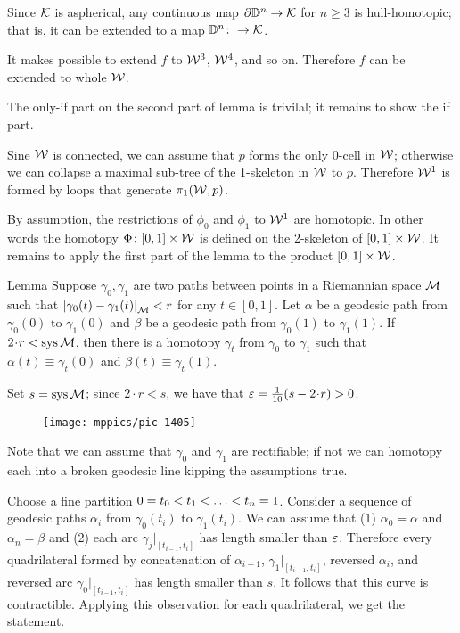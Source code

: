 Since $\mathcal{K}$ is aspherical, any continuous map $\partial\mathbb{D}^n\to \mathcal{K}$ for $n\ge 3$
is hull-homotopic;
that is, it can be extended to a map $\mathbb{D}^n\colon\to \mathcal{K}$.

It makes possible to extend $f$ to $\mathcal{W}^3$, $\mathcal{W}^4$, and so on.
Therefore $f$ can be extended to whole $\mathcal{W}$.

The only-if part on the second part of lemma is trivilal;
it remains to show the if part.

Sine $\mathcal{W}$ is connected, we can assume that $p$ forms the only 0-cell in $\mathcal{W}$;
otherwise we can collapse a maximal sub-tree of the 1-skeleton in $\mathcal{W}$ to $p$.
Therefore $\mathcal{W}^1$ is formed by loops that generate $\pi_1(\mathcal{W},p)$.

By assumption, the restrictions of $\phi_0$ and $\phi_1$ to $\mathcal{W}^1$ are homotopic.
In other words the homotopy $\Phi\colon[0,1]\times \mathcal{W}$ is defined on the 2-skeleton of $[0,1]\times \mathcal{W}$.
It remains to apply the first part of the lemma to the product $[0,1]\times \mathcal{W}$.
\qeds



\begin{thm}{Lemma}\label{lem:sys-homotopy}
Suppose $\gamma_0,\gamma_1$ are two paths between points in a Riemannian space $\mathcal{M}$ such that $\dist{\gamma_0(t)}{\gamma_1(t)}{\spc{M}}<r$ for any $t\in[0,1]$.
Let $\alpha$ be a geodesic path from $\gamma_0(0)$ to $\gamma_1(0)$ and $\beta$ be a geodesic path from $\gamma_0(1)$ to $\gamma_1(1)$. 
If $2\cdot r<\sys\spc{M}$, then there is a homotopy $\gamma_t$ from
$\gamma_0$ to $\gamma_1$ such that $\alpha(t)\equiv \gamma_t(0)$ and $\beta(t)\equiv \gamma_t(1)$.
\end{thm}

Set $s=\mathop{\rm sys}\nolimits\mathcal{M}$; 
since $2\cdot r<s$, we have that $\eps=\tfrac1{10}(s-2\cdot r)>0$.

\begin{wrapfigure}{o}{34mm}
\vskip-0mm
\centering
\texttt{[image: mppics/pic-1405]}
\end{wrapfigure}

Note that we can assume that $\gamma_0$ and $\gamma_1$ are rectifiable;
if not we can homotopy each into a broken geodesic line kipping the assumptions true. 

Choose a fine partition $0\z=t_0\z<t_1\z<\z\dots\z<t_n=1$.
Consider a sequence of geodesic paths $\alpha_i$ from $\gamma_0(t_i)$ to $\gamma_1(t_i)$.
We can assume that (1) $\alpha_0=\alpha$ and $\alpha_n=\beta$ and (2) each arc $\gamma_j|_{[t_{i-1},t_i]}$ has length smaller than $\varepsilon$.
Therefore every quadrilateral formed by concatenation  of $\alpha_{i-1}$, $\gamma_1|_{[t_{i-1},t_i]}$, reversed $\alpha_i$, and reversed arc $\gamma_0|_{[t_{i-1},t_i]}$ has length smaller than $s$.
It follows that this curve is contractible.
Applying this observation for each quadrilateral, we get the statement.
\qeds


